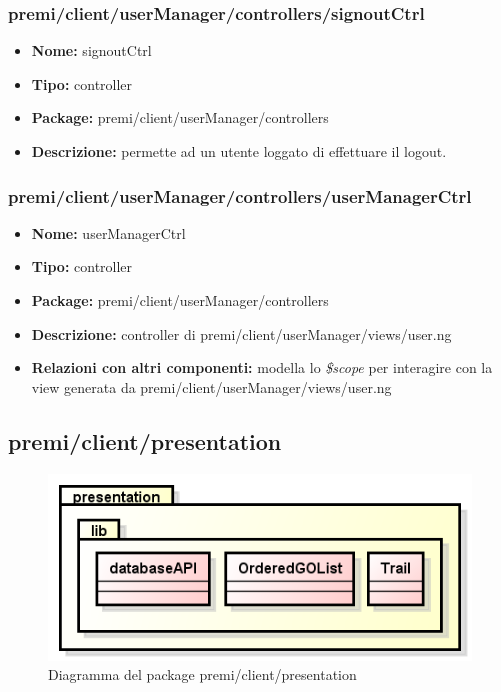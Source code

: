 \subsubsection{premi/client/userManager/controllers/signoutCtrl}
\begin{itemize}
  \item[] \textbf{Nome:} signoutCtrl
  \item[] \textbf{Tipo:} controller
  \item[] \textbf{Package:} premi/client/userManager/controllers
  \item[] \textbf{Descrizione:} permette ad un utente loggato di effettuare il logout.
\end{itemize}

\subsubsection{premi/client/userManager/controllers/userManagerCtrl}
\begin{itemize}
  \item[] \textbf{Nome:} userManagerCtrl
  \item[] \textbf{Tipo:} controller
  \item[] \textbf{Package:} premi/client/userManager/controllers
  \item[] \textbf{Descrizione:} controller di premi/client/userManager/views/user.ng
  \item[] \textbf{Relazioni con altri componenti:} modella lo \textit{\$scope} per interagire con la view generata da premi/client/userManager/views/user.ng
\end{itemize}

\subsection{premi/client/presentation}
\begin{figure}[!h]
\begin{center}
\includegraphics[scale=0.45]{img/diapkg/presentation.png}
\caption{Diagramma del package premi/client/presentation}
\end{center}
\end{figure}


